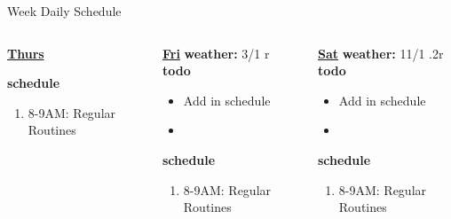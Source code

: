 \begin{columns}
\begin{column}{0.6\linewidth}
\begin{block}{Week Daily Schedule}
\begin{columns}
\begin{column}{0.14\textwidth}{\small \underline{\bf Thurs}}
\begin{itemize}
            \end{itemize} 
                {\tiny {\bf schedule}} \\
                \begin{enumerate} 
                  \tiny \item \tiny 8-9AM: Regular Routines 
                \end{enumerate}
          \end{column} 
          
          \begin{column}{0.14\textwidth}{\small \underline{\bf Fri}}
            {\tiny \bf weather: } {\tiny 3/1 r} \\ 
            {\tiny \bf todo} \\ 
            \begin{itemize}
              \tiny \item \tiny Add in schedule
            \item \tiny 
            \end{itemize} 
                {\tiny \bf schedule} \\
                \begin{enumerate} 
                  \tiny \item \tiny 8-9AM: Regular Routines 
                \end{enumerate}
          \end{column}

          \begin{column}{0.15\textwidth}{\small \underline{\bf Sat}}
            {\tiny \bf weather: } {\tiny 11/1 .2r} \\ 
            { \tiny \bf todo} \\ 
            \begin{itemize}
              \tiny \item \tiny Add in schedule
            \item \tiny 
            \end{itemize} 
                {\tiny \bf schedule} \\
                \begin{enumerate} 
                  \tiny \item \tiny 8-9AM: Regular Routines 
                \end{enumerate}
          \end{column}
         

\end{columns}
\end{block}
\end{column}
\end{columns}
